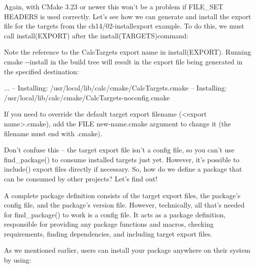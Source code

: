 Again, with CMake 3.23 or newer this won’t be a problem if FILE\_SET HEADERS is used correctly. Let’s see how we can generate and install the export file for the targets from the ch14/02-installexport example. To do this, we must call install(EXPORT) after the install(TARGETS)command:



Note the reference to the CalcTargets export name in install(EXPORT). Running cmake -{}-install in the build tree will result in the export file being generated in the specified destination:

\begin{shell}
...
-- Installing: /usr/local/lib/calc/cmake/CalcTargets.cmake
-- Installing: /usr/local/lib/calc/cmake/CalcTargets-noconfig.cmake
\end{shell}

If you need to override the default target export filename (<export name>.cmake), add the FILE new-name.cmake argument to change it (the filename must end with .cmake).

Don’t confuse this – the target export file isn’t a config file, so you can’t use find\_package() to consume installed targets just yet. However, it’s possible to include() export files directly if necessary. So, how do we define a package that can be consumed by other projects? Let’s find out!


A complete package definition consists of the target export files, the package’s config file, and the package’s version file. However, technically, all that’s needed for find\_package() to work is a config file. It acts as a package definition, responsible for providing any package functions and macros, checking requirements, finding dependencies, and including target export files.

As we mentioned earlier, users can install your package anywhere on their system by using:

